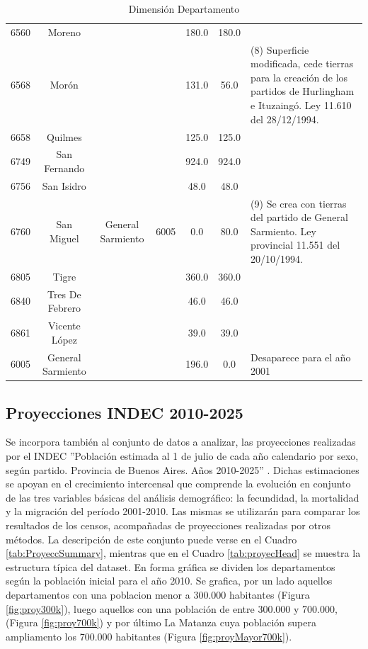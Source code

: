 \documentclass{article}
\theoremstyle{mytheoremstyle}
\theoremstyle{mytheoremstyle}
\theoremstyle{myproblemstyle}
\begin{document}
\begin{table}[htbp]
\begin{tabular}{|c|c|c|c|c|c|p{5cm}|}
        6560 & Moreno              &&& 180.0             & 180.0 & \\
        6568 & Morón                &&& 131.0             & 56.0  & (8) Superficie  modificada, cede tierras para la creación de los partidos de Hurlingham e Ituzaingó. Ley 11.610 del 28/12/1994.\\
        6658 & Quilmes            && & 125.0             & 125.0 &       \\
        6749 & San Fernando       && & 924.0             & 924.0 &    \\
        6756 & San Isidro         && & 48.0              & 48.0  &    \\
        6760 & San Miguel          & General Sarmiento & 6005  & 0.0 & 80.0 & (9) Se crea con tierras del partido de General Sarmiento. Ley provincial 11.551 del 20/10/1994. \\
        6805 & Tigre            &&   & 360.0             & 360.0 &     \\
        6840 & Tres De Febrero   &&  & 46.0              & 46.0  &      \\
        6861 & Vicente López     &&  & 39.0              & 39.0  &  \\
        6005 & General Sarmiento  && & 196.0             & 0.0   & Desaparece para el año 2001   \\        
     \hline
    \end{tabular}
    \caption{Dimensión Departamento}
    \label{tab:DimDepto}
\end{table}

\subsection{Proyecciones INDEC 2010-2025}
Se incorpora también al conjunto de datos a analizar, las proyecciones realizadas por el INDEC ''Población estimada al 1 de julio de
 cada año calendario por sexo, según partido. Provincia de Buenos Aires. Años 2010-2025'' .
 Dichas estimaciones se apoyan en el crecimiento intercensal que comprende la evolución en conjunto
 de las tres variables básicas del análisis demográfico: la fecundidad, la mortalidad y la migración del período 2001-2010.  
Las mismas se utilizarán para comparar los resultados de los censos, acompañadas de
 proyecciones realizadas por otros métodos.\newline\newline
 La  descripción de este conjunto  puede verse en el Cuadro \ref{tab:ProyeccSummary}, mientras que en el Cuadro \ref{tab:proyecHead} se muestra la estructura típica del 
 dataset. En forma gráfica se dividen los departamentos según la población inicial para el año 2010. 
 Se grafica, por un lado aquellos departamentos con una poblacion menor a 300.000 habitantes (Figura \ref{fig:proy300k}), luego aquellos con una población de entre 300.000 y 700.000,
  (Figura \ref{fig:proy700k}) y por último La Matanza cuya población supera ampliamento los 700.000 habitantes (Figura \ref{fig:proyMayor700k}).
\end{document}
